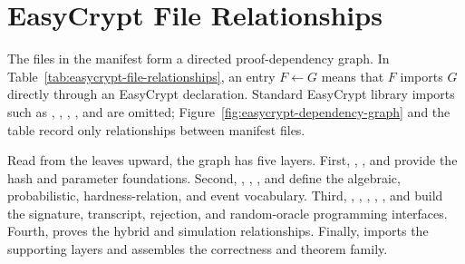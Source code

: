 \section{EasyCrypt File Relationships}
\label{sec:easycrypt-file-relationships}

The files in the manifest form a directed proof-dependency graph.  In
Table~\ref{tab:easycrypt-file-relationships}, an entry \(F \leftarrow G\)
means that \(F\) imports \(G\) directly through an EasyCrypt
 declaration.  Standard EasyCrypt library imports such as
, , , , and  are
omitted; Figure~\ref{fig:easycrypt-dependency-graph} and the table record only
relationships between manifest files.

Read from the leaves upward, the graph has five layers.  First,
, , and
 provide the hash and parameter foundations.  Second,
, ,
, and  define the
algebraic, probabilistic, hardness-relation, and event vocabulary.  Third,
, , ,
, , and
 build the signature, transcript, rejection,
and random-oracle programming interfaces.  Fourth,
 proves the hybrid and simulation relationships.
Finally,  imports the
supporting layers and assembles the correctness and \eufcma{} theorem family.

